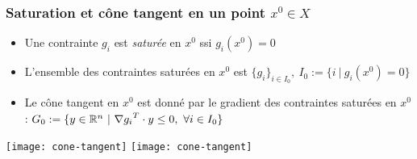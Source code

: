 \documentclass{beamer}
\newcommand{\R}{{\ensuremath\mathbb{R}}}
\begin{document}
\begin{frame}
  \frametitle{Saturation et cône tangent en un point $x^0 \in X$}

  \begin{itemize}
    \item Une contrainte $g_i$ est \emph{saturée} en $x^0$ ssi $g_i(x^0) = 0$
    \item L'ensemble des contraintes saturées en $x^0$ est
      $\{g_i\}_{i \in I_0}, \ I_0 := \{i \ | \ g_i(x^0) = 0 \}$
    \item Le cône tangent en $x^0$ est donné par le gradient des contraintes saturées en $x^0$ :
      $G_0 := \{ y \in \R^n \ | \ {\nabla g_i}^T \cdot y \leq 0, \ \forall i \in I_0 \}$ 
  \end{itemize}

  \begin{center}
      \texttt{[image: cone-tangent]} \hspace{0.01\textwidth}   
      \texttt{[image: cone-tangent]}    
  \end{center}
  
\end{frame}
\end{document}
